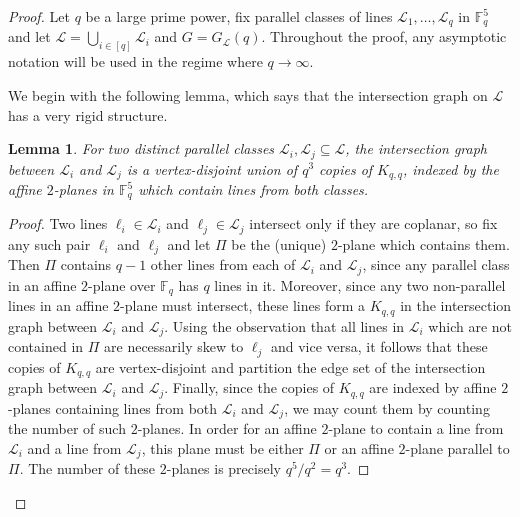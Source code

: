 \documentclass[A4paper,reqno,oneside,11pt]{amsart}
\theoremstyle{plain}
\newtheorem{lemma}[theorem]{Lemma}
\theoremstyle{definition}
\newcommand{\scL}{\mathscr{L}}
\newcommand{\F}{\mathbb{F}}
\def\l{\ell}
\begin{document}
\begin{proof}
    Let $q$ be a large prime power, fix parallel classes of lines $\scL_1, \dots, \scL_q$ in $\F_q^5$ and let $\scL = \bigcup_{i \in [q]} \scL_i$ and $G = G_\scL(q)$.
    Throughout the proof, any asymptotic notation will be used in the regime where $q \to \infty$.

    We begin with the following lemma, which says that the intersection graph on $\scL$ has a very rigid structure.

    \begin{lemma}
    \label{lem: intersection-graph}
        For two distinct parallel classes $\scL_i, \scL_j \subseteq \scL$, the intersection graph between $\scL_i$ and $\scL_j$ is a vertex-disjoint union of $q^3$ copies of
        $K_{q,q}$, indexed by the affine $2$-planes in $\F_q^5$ which contain lines from both classes.
    \end{lemma}

    \begin{proof}
        Two lines $\l_i \in \scL_i$ and $\l_j \in \scL_j$ intersect only if they are coplanar, so fix any such pair $\l_i$ and $\l_j$ and let $\Pi$ be the (unique) $2$-plane which contains them.
        Then $\Pi$ contains $q-1$ other lines from each of $\scL_i$ and $\scL_j$, since any parallel class in an affine $2$-plane over $\F_q$ has $q$ lines in it.
        Moreover, since any two non-parallel lines in an affine $2$-plane must intersect, these lines form a $K_{q,q}$ in the intersection graph between $\scL_i$ and $\scL_j$.
        Using the observation that all lines in $\scL_i$ which are not contained in $\Pi$ are necessarily skew to $\l_j$ and vice versa, it follows that these copies of $K_{q,q}$ are vertex-disjoint and partition the edge set of the intersection graph between $\scL_i$ and $\scL_j$.
        Finally, since the copies of $K_{q,q}$ are indexed by affine $2$-planes containing lines from both $\scL_i$ and $\scL_j$, we may count them by counting the number of such $2$-planes. In order for an affine $2$-plane to contain a line from $\scL_i$ and a line from $\scL_j$, this plane must be either $\Pi$ or an affine $2$-plane parallel to $\Pi$. The number of these $2$-planes is precisely $q^5/q^2 = q^3$. 
    \end{proof}


\end{proof}
\end{document}
